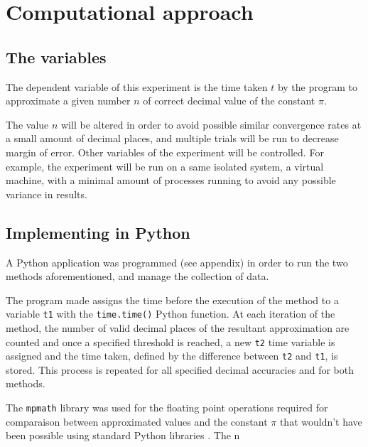 \section{Computational approach}

\subsection{The variables}
The dependent variable of this experiment is the time taken $t$ by the program 
to approximate a given number $n$ of correct decimal value of the constant $\pi$.

The value $n$ will be altered in order to avoid possible similar convergence rates 
at a small amount of decimal places, and multiple trials will be run to decrease 
margin of error. Other variables of the experiment will be controlled. For example, the experiment 
will be run on a same isolated system, a virtual machine, with a minimal amount of 
processes running to avoid any possible variance in results. 


\subsection{Implementing in Python}

A Python application was programmed (see appendix) in order to run the two 
methods aforementioned, and manage the collection of data. 

The program made assigns the time before the execution of the method to a variable \verb|t1| 
with the \verb|time.time()| Python function. At each iteration of the method, the number of valid decimal 
places of the resultant approximation are counted and once a specified threshold is reached, 
a new \verb|t2| time variable is assigned and the time taken, defined by the difference between 
\verb|t2| and \verb|t1|, is stored. This process is repeated for all specified decimal accuracies and 
for both methods.

The \verb|mpmath| library was used for the floating point operations required 
for comparaison between approximated values and the constant $\pi$ that wouldn't 
have been possible using standard Python libraries \cite{mpmath}. The n 